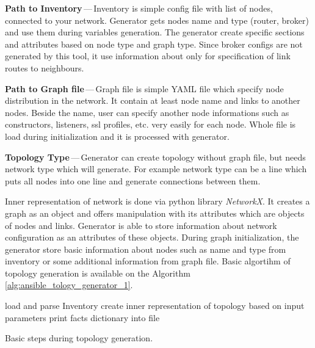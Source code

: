\begin{description}
	\item \textbf{Path to Inventory}\,---\,Inventory is simple config file with list of nodes, connected to your network. Generator gets nodes name and type (router, broker) and use them during variables generation. The generator create specific sections and attributes based on node type and graph type. Since broker configs are not generated by this tool, it use information about only for specification of link routes to neighbours.
	\item \textbf{Path to Graph file}\,---\,Graph file is simple YAML file which specify node distribution in the network. It contain at least node name and links to another nodes. Beside the name, user can specify another node informations such as constructors, listeners, ssl profiles, etc. very easily for each node. Whole file is load during initialization and it is processed with generator.
	\item \textbf{Topology Type}\,---\,Generator can create topology without graph file, but needs network type which will generate. For example network type can be a line which puts all nodes into one line and generate connections between them.
\end{description}

Inner representation of network is done via python library \emph{NetworkX}\footnotemark. It creates a graph as an object and offers manipulation with its attributes which are objects of nodes and links. Generator is able to store information about network configuration as an attributes of these objects. During graph initialization, the generator store basic information about nodes such as name and type from inventory or some additional information from graph file. Basic algortihm of topology generation is available on the Algorithm \ref{alg:ansible_tology_generator_1}.

\begin{center}
	\begin{algorithm}[H]
		 load and parse Inventory\;
		 create inner representation of topology based on input parameters\;
		 print facts dictionary into file\;
		 \caption{Basic steps during topology generation.}
		 \label{alg:ansible_tology_generator_1}
	\end{algorithm}
\end{center}

